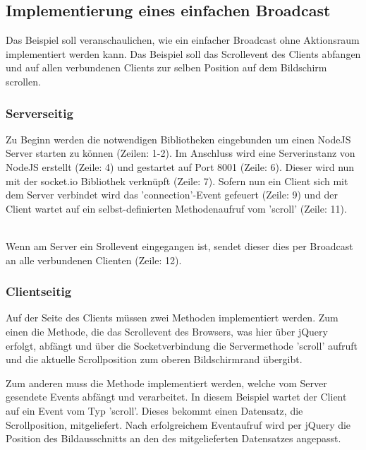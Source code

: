 	
	\subsection{Implementierung eines einfachen Broadcast}
	Das Beispiel soll veranschaulichen, wie ein einfacher Broadcast ohne Aktionsraum implementiert werden kann. Das Beispiel soll das Scrollevent des Clients abfangen und auf allen verbundenen Clients zur selben Position auf dem Bildschirm scrollen.
	
	\subsubsection{Serverseitig}
	Zu Beginn werden die notwendigen Bibliotheken eingebunden um einen NodeJS Server starten zu können (Zeilen: 1-2). Im Anschluss wird  eine Serverinstanz von NodeJS erstellt (Zeile: 4) und gestartet auf Port 8001 (Zeile: 6). Dieser wird nun mit der socket.io Bibliothek verknüpft (Zeile: 7). Sofern nun ein Client sich mit dem Server verbindet wird das 'connection'-Event gefeuert (Zeile: 9) und der Client wartet auf ein selbst-definierten Methodenaufruf vom 'scroll' (Zeile: 11).
	
	\\Wenn am Server ein Srollevent eingegangen ist, sendet dieser dies per Broadcast an alle verbundenen Clienten (Zeile: 12).
	
	\subsubsection{Clientseitig}
	Auf der Seite des Clients müssen zwei Methoden implementiert werden. Zum einen die Methode, die das Scrollevent des Browsers, was hier über jQuery erfolgt, abfängt und über die Socketverbindung die Servermethode 'scroll' aufruft und die aktuelle Scrollposition zum oberen Bildschirmrand übergibt.
	
	
	Zum anderen muss die Methode implementiert werden, welche vom Server gesendete Events abfängt und verarbeitet. In diesem Beispiel wartet der Client auf ein Event vom Typ 'scroll'. Dieses bekommt einen Datensatz, die Scrollposition, mitgeliefert. Nach erfolgreichem Eventaufruf wird per jQuery die Position des Bildausschnitts an den des mitgelieferten Datensatzes angepasst.
	
